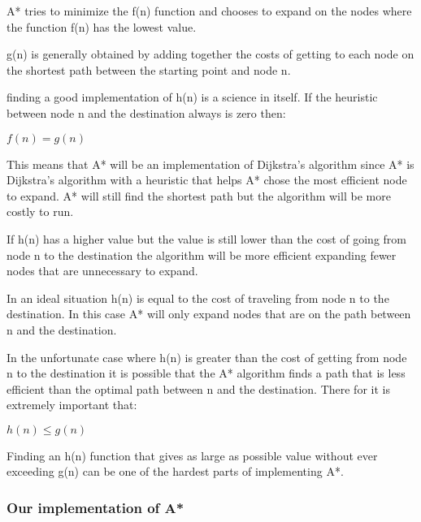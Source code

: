\documentclass[12pt, a4paper]{article}
\begin{document}
A* tries to minimize the f(n) function and chooses to expand on the nodes where the function f(n) has the lowest value. 

g(n) is generally obtained by adding together the costs of getting to each node on the shortest path between the starting point and node n. 

finding a good implementation of h(n) is a science in itself. If the heuristic between node n and the destination always is zero then:

\begin{center}
$f(n) = g(n)$
\end{center}

This means that A* will be an implementation of Dijkstra’s algorithm since A* is Dijkstra’s algorithm with a heuristic that helps A* chose the most efficient node to expand. A* will still find the shortest path but the algorithm will be more costly to run.

If h(n) has a higher value but the value is still lower than the cost of going from node n to the destination the algorithm will be more efficient expanding fewer nodes that are unnecessary to expand. 

In an ideal situation h(n) is equal to the cost of traveling from node n to the destination. In this case A* will only expand nodes that are on the path between n and the destination. 

In the unfortunate case where h(n) is greater than the cost of getting from node n to the destination it is possible that the A* algorithm finds a path that is less efficient than the optimal path between n and the destination. There for it is extremely important that:

\begin{center}
$h(n) \leq g(n)$
\end{center}

Finding an h(n) function that gives as large as possible value without ever exceeding g(n) can be one of the hardest parts of implementing A*.



\subsubsection{Our implementation of A*}

\end{document}
